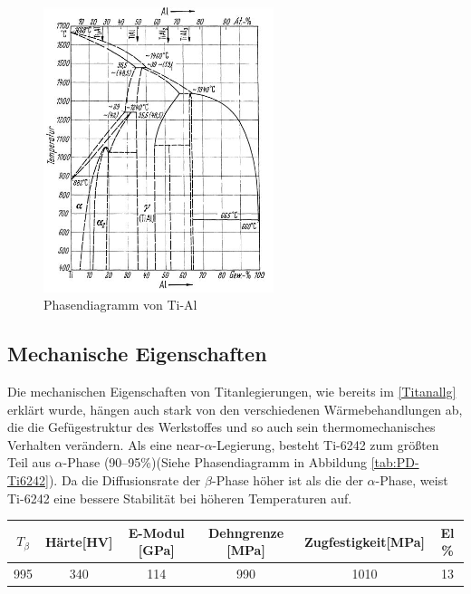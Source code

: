 \begin{figure}[H]
	\centering
	\includegraphics[width=0.6\textwidth]{./Bilder/TiAl.jpg}
	\caption{Phasendiagramm von Ti-Al \cite{Zwicker.2014}}
	\label{fig:PD_tial}
\end{figure}




\subsection{Mechanische Eigenschaften}

Die mechanischen Eigenschaften von Titanlegierungen, wie bereits im \ref{Titanallg} erklärt wurde, hängen auch stark von den verschiedenen Wärmebehandlungen ab, die die Gefügestruktur des Werkstoffes und so auch sein thermomechanisches Verhalten verändern.
Als eine near-$\alpha$-Legierung, besteht Ti-6242 zum größten Teil aus $\alpha$-Phase (90--95\%)(Siehe Phasendiagramm in Abbildung \ref{tab:PD-Ti6242}). Da die Diffusionsrate der $\beta$-Phase höher ist als die der $\alpha$-Phase, weist Ti-6242 eine bessere Stabilität bei höheren Temperaturen auf. \cite{Prasad.2017} 

\begin{table}[H]
	\centering	
	\begin{tabular}{|c| c| c| c| c| c|}										
		\hline
		$T_{\beta}$ & Härte[HV] & E-Modul [GPa]& Dehngrenze [MPa]&Zugfestigkeit[MPa]& El \% \\
		\hline
		995&340&114&990&1010&13\\
		\hline
	\end{tabular}
	\label{Mec.}
\end{table}

